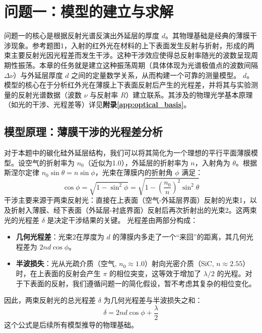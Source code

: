 \documentclass[withoutpreface,bwprint]{cumcmthesis} %
\begin{document}
\section{问题一：模型的建立与求解}


问题一的核心是根据反射光谱反演出外延层的厚度 $d$。其物理基础是经典的薄膜干涉现象。参考题图1，入射的红外光在材料的上下表面发生反射与折射，形成的两束主要反射光因光程差而发生干涉。这种干涉效应使得总反射率随光的波数呈现周期性振荡。本章的任务就是建立这种振荡周期（具体体现为光谱极值点的波数间隔 $\Delta\nu$）与外延层厚度 $d$ 之间的定量数学关系，从而构建一个可靠的测量模型。
$d$。模型的核心在于分析红外光在薄膜上下表面反射后产生的光程差，并将其与实验测量的反射光谱数据（波数 $\nu$ 与反射率 $R$）建立联系。其涉及的物理光学基本原理（如光的干涉、光程差等）详见\textbf{附录\ref{app:optical_basis}}。

\subsection{模型原理：薄膜干涉的光程差分析}
对于本题中的碳化硅外延层结构，我们可以将其简化为一个理想的平行平面薄膜模型。设空气的折射率为 $n_0$（近似为1.0），外延层的折射率为 $n$，入射角为 $\theta$。根据斯涅尔定律 $n_0 \sin\theta = n \sin\phi$，光束在薄膜内的折射角 $\phi$ 满足：
\begin{equation}
    \cos\phi = \sqrt{1 - \sin^2\phi} = \sqrt{1 - \left(\frac{n_0}{n}\right)^2 \sin^2\theta}
\end{equation}
干涉主要来源于两束反射光：直接在上表面（空气-外延层界面）反射的光束1，以及折射入薄膜、经下表面（外延层-衬底界面）反射后再次折射出的光束2。这两束光的光程差 $\delta$ 是决定干涉结果的关键。
光程差由两部分构成：
\begin{itemize}
    \item \textbf{几何光程差}：光束2在厚度为 $d$ 的薄膜内多走了一个“来回”的距离，其几何光程差为 $2nd\cos\phi$。
    \item \textbf{半波损失}：光从光疏介质（空气, $n_0 \approx 1.0$）射向光密介质（SiC, $n \approx 2.55$）时，在上表面的反射会产生 $\pi$ 的相位突变，这等效于增加了 $\lambda/2$ 的光程。对于下表面的反射，我们遵循问题一的简化假设，暂不考虑其复杂的相位变化。
\end{itemize}
因此，两束反射光的总光程差 $\delta$ 为几何光程差与半波损失之和：
\begin{equation}
    \delta = 2nd\cos\phi + \frac{\lambda}{2}
    \label{eq:path_diff}
\end{equation}
这个公式是后续所有模型推导的物理基础。
\end{document}
